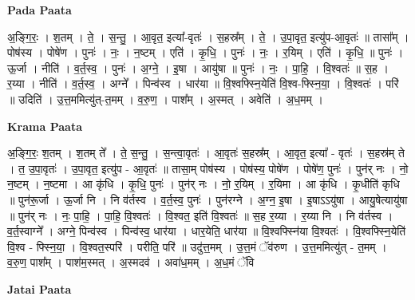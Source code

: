 \documentclass[17pt]{extarticle}
\begin{document}
\textbf{Pada Paata} \newline

अ॒ङ्गि॒रः॒ । श॒तम् । ते॒ । स॒न्तु॒ । आ॒वृत॒ इत्या᳚-वृतः॑ । स॒हस्र᳚म् । ते॒ । उ॒पा॒वृत॒ इत्यु॑प-आ॒वृतः॑ ॥ तासा᳚म् । पोष॑स्य । पोषे॑ण । पुनः॑ । नः॒ । न॒ष्टम् । एति॑ । कृ॒धि॒ । पुनः॑ । नः॒ । र॒यिम् । एति॑ । कृ॒धि॒ ॥ पुनः॑ । ऊ॒र्जा । नीति॑ । व॒र्त॒स्व॒ । पुनः॑ । अ॒ग्ने॒ । इ॒षा । आयु॑षा ॥ पुनः॑ । नः॒ । पा॒हि॒ । वि॒श्वतः॑ ॥ स॒ह । र॒य्या । नीति॑ । व॒र्त॒स्व॒ । अग्ने᳚ । पिन्व॑स्व । धार॑या ॥ वि॒श्वफ्स्नि॒येति॑ वि॒श्व-फ्स्नि॒या॒ । वि॒श्वतः॑ । परि॑ ॥ उदिति॑ । उ॒त्त॒ममित्यु॑त्-त॒मम् । व॒रु॒ण॒ । पाश᳚म् । अ॒स्मत् । अवेति॑ । अ॒ध॒मम् ।  \newline


\textbf{Krama Paata} \newline

अ॒ङ्गि॒रः॒ श॒तम् । श॒तम् ते᳚ । ते॒ स॒न्तु॒ । स॒न्त्वा॒वृतः॑ । आ॒वृतः॑ स॒हस्र᳚म् । आ॒वृत॒ इत्या᳚ - वृतः॑ । स॒हस्र॑म् ते । त॒ उ॒पा॒वृतः॑ । उ॒पा॒वृत॒ इत्यु॑प - आ॒वृतः॑ ॥ तासा॒म् पोष॑स्य । पोष॑स्य॒ पोषे॑ण । पोषे॑ण॒ पुनः॑ । पुन॑र् नः । नो॒ न॒ष्टम् । न॒ष्टमा । आ कृ॑धि । कृ॒धि॒ पुनः॑ । पुन॑र् नः । नो॒ र॒यिम् । र॒यिमा । आ कृ॑धि । कृ॒धीति॑ कृधि ॥ पुन॑रू॒र्जा । ऊ॒र्जा नि । नि व॑र्तस्व । व॒र्त॒स्व॒ पुनः॑ । पुन॑रग्ने । अ॒ग्न॒ इ॒षा । इ॒षाऽऽयु॑षा । आयु॒षेत्यायु॑षा ॥ पुन॑र् नः । नः॒ पा॒हि॒ । पा॒हि॒ वि॒श्वतः॑ । वि॒श्वत॒ इति॑ वि॒श्वतः॑ ॥ स॒ह र॒य्या । र॒य्या नि । नि व॑र्तस्व । व॒र्त॒स्वाग्ने᳚ । अग्ने॒ पिन्व॑स्व । पिन्व॑स्व॒ धार॑या । धार॒येति॒ धार॑या ॥ वि॒श्वफ्स्नि॑या वि॒श्वतः॑ । वि॒श्वफ्स्नि॒येति॑ वि॒श्व - फ्स्नि॒या॒ । वि॒श्वत॒स्परि॑ । परीति॒ परि॑ ॥ उदु॑त्त॒मम् । उ॒त्त॒मं ॅव॑रुण । उ॒त्त॒ममित्यु॑त् - त॒मम् । व॒रु॒ण॒ पाश᳚म् । पाश॑म॒स्मत् । अ॒स्मदव॑ । अवा॑ध॒मम् । अ॒ध॒मं ॅवि \newline

\textbf{Jatai Paata} \newline
\end{document}
